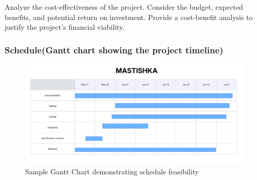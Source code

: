 
 Analyze the cost-effectiveness of the project. Consider the budget, expected benefits, and potential return on investment. Provide a cost-benefit analysis to justify the project's financial viability.
 
\subsubsection{Schedule(Gantt chart showing the project timeline)}
\begin{figure}[H]
    \centering
    \includegraphics[width=1\linewidth]{Images/gantt.png}
    \caption{Sample Gantt Chart demonstrating schedule feasibility}
    \label{fig:enter-label}
\end{figure}
  
